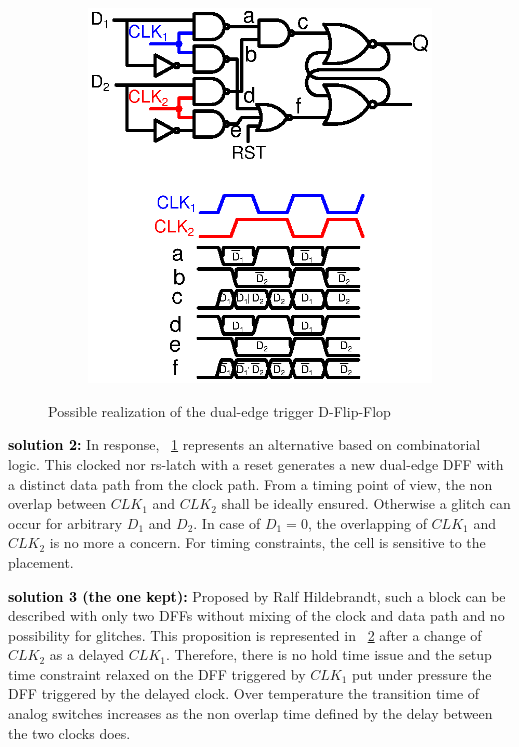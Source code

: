 \begin{figure}[htp]
\begin{subfigure}[b]{0.48\textwidth}
		\includegraphics[width=\textwidth]{Chapter4/Figs/det-dff-solution2.ps}
		\label{fig:solution-2}
	\end{subfigure}
	\caption{Possible realization of the dual-edge trigger D-Flip-Flop}
	\label{fig:digital-non-overlap}
\end{figure}

\textbf{\textcolor{black}{solution 2:}}
In response, \figurename~\ref{fig:solution-2} represents an alternative based on combinatorial logic. This clocked nor rs-latch with a reset generates a new dual-edge DFF with a distinct data path from the clock path. From a timing point of view, the non overlap between \(CLK_1\) and \(CLK_2\) shall be ideally ensured. Otherwise a glitch can occur for arbitrary \(D_1\) and \(D_2\). In case of \(D_1 = 0\), the overlapping of \(CLK_1\) and \(CLK_2\) is no more a concern. For timing constraints, the cell is sensitive to the placement.

\textbf{\textcolor{black}{solution 3 (the one kept):}}
Proposed by Ralf Hildebrandt, such a block can be described with only two DFFs without mixing of the clock and data path and no possibility for glitches. This proposition is represented in \figurename~\ref{fig:digital-non-overlap} after a change of \(CLK_2\) as a delayed \(CLK_1\). Therefore, there is no hold time issue and the setup time constraint relaxed on the DFF triggered by \(CLK_1\) put under pressure the DFF triggered by the delayed clock. Over temperature the transition time of analog switches increases as the non overlap time defined by the delay between the two clocks does.


